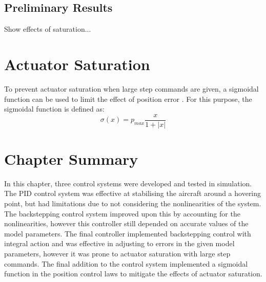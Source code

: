 \subsection{Preliminary Results}
Show effects of saturation...

\section{Actuator Saturation}
To prevent actuator saturation when large step commands are given, a sigmoidal function can be used to limit the effect of position error \cite{Cabecinhas2009}. For this purpose, the sigmoidal function is defined as:
\[\sigma(x)=p_{max}\frac{x}{1+|x|}\]



\section{Chapter Summary}
In this chapter, three control systems were developed and tested in simulation. The PID control system was effective at stabilising the aircraft around a hovering point, but had limitations due to not considering the nonlinearities of the system. The backstepping control system improved upon this by accounting for the nonlinearities, however this controller still depended on accurate values of the model parameters. The final controller implemented backstepping control with integral action and was effective in adjusting to errors in the given model parameters, however it was prone to actuator saturation with large step commands. The final addition to the control system implemented a sigmoidal function in the position control laws to mitigate the effects of actuator saturation.



\clearpage



